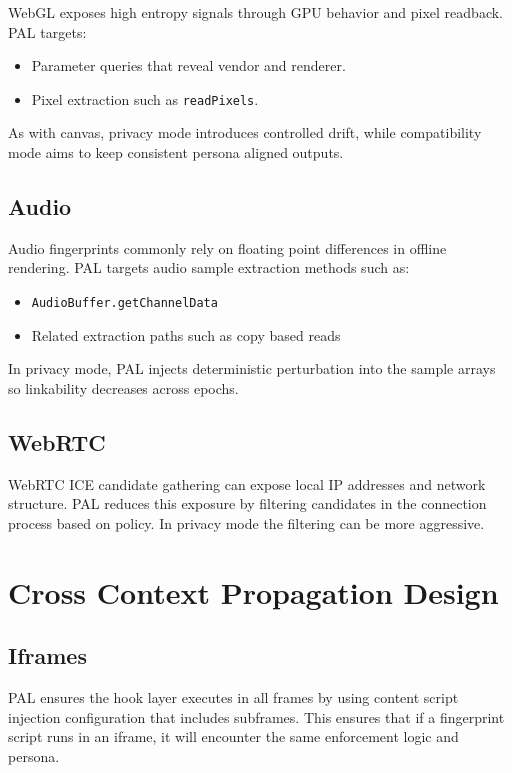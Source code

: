 \documentclass[11pt]{report}
\begin{document}
WebGL exposes high entropy signals through GPU behavior and pixel readback. PAL targets:

\begin{itemize}
    \item Parameter queries that reveal vendor and renderer.
    \item Pixel extraction such as \texttt{readPixels}.
\end{itemize}

As with canvas, privacy mode introduces controlled drift, while compatibility mode aims to keep consistent persona aligned outputs.

\subsection{Audio}

Audio fingerprints commonly rely on floating point differences in offline rendering. PAL targets audio sample extraction methods such as:

\begin{itemize}
    \item \texttt{AudioBuffer.getChannelData}
    \item Related extraction paths such as copy based reads
\end{itemize}

In privacy mode, PAL injects deterministic perturbation into the sample arrays so linkability decreases across epochs.

\subsection{WebRTC}

WebRTC ICE candidate gathering can expose local IP addresses and network structure. PAL reduces this exposure by filtering candidates in the connection process based on policy. In privacy mode the filtering can be more aggressive.

\section{Cross Context Propagation Design}

\subsection{Iframes}

PAL ensures the hook layer executes in all frames by using content script injection configuration that includes subframes. This ensures that if a fingerprint script runs in an iframe, it will encounter the same enforcement logic and persona.
\end{document}
